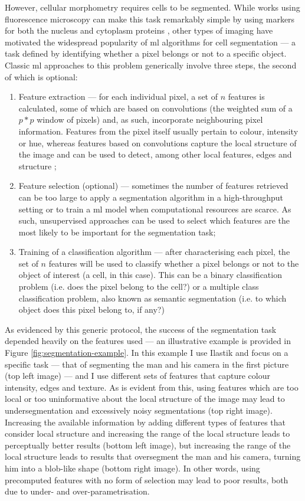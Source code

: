 However, cellular morphometry requires cells to be segmented. While works using fluorescence microscopy can make this task remarkably simple by using markers for both the nucleus and cytoplasm proteins \cite{Fuchs2010-pk,Gustafsdottir2013-ul}, other types of imaging have motivated the widespread popularity of \ac{ml} algorithms for cell segmentation --- a task defined by identifying whether a pixel belongs or not to a specific object. Classic \ac{ml} approaches to this problem generically involve three steps, the second of which is optional:

\begin{enumerate}
	\item Feature extraction --- for each individual pixel, a set of $n$ features is calculated, some of which are based on convolutions (the weighted sum of a $p*p$ window of pixels) and, as such, incorporate neighbouring pixel information. Features from the pixel itself usually pertain to colour, intensity or hue, whereas features based on convolutions capture the local structure of the image and can be used to detect, among other local features, edges \cite{Canny1986-pi} and structure \cite{Sato1998-sy};
	\item Feature selection (optional) --- sometimes the number of features retrieved can be too large to apply a segmentation algorithm in a high-throughput setting or to train a \ac{ml} model when computational resources are scarce. As such, unsupervised approaches can be used to select which features are the most likely to be important for the segmentation task;
	\item Training of a classification algorithm --- after characterising each pixel, the set of $n$ features will be used to classify whether a pixel belongs or not to the object of interest (a cell, in this case). This can be a binary classification problem (i.e. does the pixel belong to the cell?) or a multiple class classification problem, also known as semantic segmentation (i.e. to which object does this pixel belong to, if any?)
\end{enumerate}

As evidenced by this generic protocol, the success of the segmentation task depended heavily on the features used ---  an illustrative example is provided in Figure \ref{fig:segmentation-example}. In this example I use Ilastik \cite{Sommer2011-ds} and focus on a specific task --- that of segmenting the man and his camera in the first picture (top left image) --- and I use different sets of features that capture colour intensity, edges and texture. As is evident from this, using features which are too local or too uninformative about the local structure of the image may lead to undersegmentation and excessively noisy segmentations (top right image). Increasing the available information by adding different types of features that consider local structure and increasing the range of the local structure leads to perceptually better results (bottom left image), but increasing the range of the local structure leads to results that oversegment the man and his camera, turning him into a blob-like shape (bottom right image). In other words, using precomputed features with no form of selection may lead to poor results, both due to under- and over-parametrisation. 

